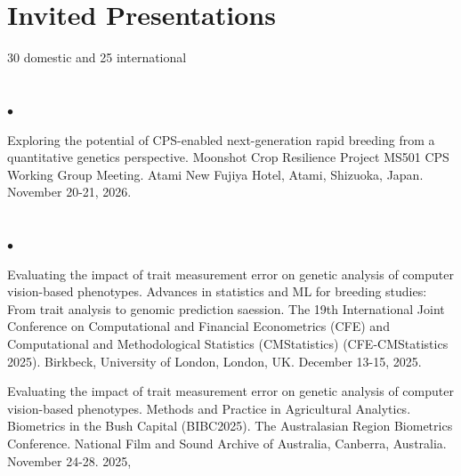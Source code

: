 \documentclass[margin,line,10pt]{res}
\newenvironment{list1}{
  \begin{list}{\ding{113}}{%
      \setlength{\itemsep}{0in}
      \setlength{\parsep}{0in} \setlength{\parskip}{0in}
      \setlength{\topsep}{0in} \setlength{\partopsep}{0in} 
      \setlength{\leftmargin}{0.17in}}}{\end{list}}
\newenvironment{list2}{
  \begin{list}{$\bullet$}{%
      \setlength{\itemsep}{0in}
      \setlength{\parsep}{0in} \setlength{\parskip}{0in}
      \setlength{\topsep}{0in} \setlength{\partopsep}{0in} 
      \setlength{\leftmargin}{0.2in}}}{\end{list}}
\begin{document}
\begin{resume}
\begin{list1}
\end{list1}




\vspace{1.0cm}
\section{\sc Invited Presentations}
\vspace{0.5cm}
30 domestic and 25 international \\
\noindent


\section{}
\begin{list2}

  \item [{\bf 55}.]  Exploring the potential of CPS-enabled next-generation rapid breeding from a quantitative genetics perspective. Moonshot Crop Resilience Project MS501 CPS Working Group Meeting. Atami New Fujiya Hotel, Atami, Shizuoka, Japan. November 20-21, 2026.

\end{list2}


\section{}
\begin{list2}


  \item [{\bf 54}.]  Evaluating the impact of trait measurement error on genetic analysis of computer vision-based phenotypes. Advances in statistics and ML for breeding studies: From trait analysis to genomic prediction saession. The 19th International Joint Conference on Computational and Financial Econometrics (CFE) and Computational and Methodological Statistics (CMStatistics) (CFE-CMStatistics 2025).  Birkbeck, University of London, London, UK. December 13-15, 2025.
  
  \vspace{0.5cm}

  
  \item [{\bf 53}.] Evaluating the impact of trait measurement error on genetic analysis of computer vision-based phenotypes. Methods and Practice in Agricultural Analytics. Biometrics in the Bush Capital (BIBC2025). The Australasian Region Biometrics Conference. National Film and Sound Archive of Australia, Canberra, Australia. November 24-28. 2025,


\end{list2}
\end{resume}
\end{document}
